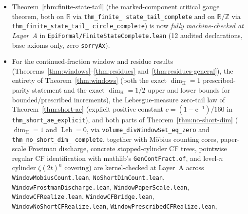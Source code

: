 \documentclass[11pt]{article}
\theoremstyle{definition}
\theoremstyle{remark}
\newcommand{\R}{\mathbb{R}}
\newcommand{\Z}{\mathbb{Z}}
\newcommand{\ee}{\mathrm{e}}
\newcommand{\dimH}{\dim_{\mathrm{H}}}
\begin{document}
\begin{itemize}[leftmargin=1.5em]
(Corollary~\ref{cor:exact-gauge}(i) on $\R$ and \texttt{UnitAddCircle}), and
verifies the binary Cantor-tree positivity, $\mathcal H^{g_2}$-infinitude on
every nonempty open subset of $\R/\Z$, $\sigma$-finiteness,
$\mathcal H^{h_k}$-nullity, and $g_\beta$ threshold dichotomy for
$E_{\mathrm{lim}}(k/4)$ in Theorem~\ref{thm:trichotomy}(ii), while
\texttt{TrichotomyAndPolyExtension.lean} proves the signed-limit coset collapse
$E_{\mathrm{lim}}^\pm(k/4)=x_k^\pm+L$ in Theorem~\ref{thm:trichotomy}(iii).
\item Theorem~\ref{thm:finite-state-tail} (the marked-component critical gauge
theorem, both on $\R$ via \texttt{thm\_\allowbreak finite\_\allowbreak
state\_\allowbreak tail\_\allowbreak complete} and on $\R/\Z$ via
\texttt{thm\_\allowbreak finite\_\allowbreak state\_\allowbreak tail\_\allowbreak
circle\_\allowbreak complete}) is now \emph{fully machine-checked at Layer~A}
in \texttt{EpiFormal/\allowbreak Finite\allowbreak State\allowbreak Complete.lean}
(12 audited declarations, base axioms only, zero \texttt{sorryAx}).
\item For the continued-fraction window and residue results
(Theorems~\ref{thm:windows}--\ref{thm:residues} and~\ref{thm:residues-general}),
the entirety of Theorem~\ref{thm:windows} (both the exact $\dimH=1$
prescribed-parity statement and the exact $\dimH=1/2$ upper and lower bounds
for bounded/prescribed increments), the Lebesgue-measure zero-tail law of
Theorem~\ref{thm:short-ae} (explicit positive constant $c = (1-\ee^{-1})/160$ in
\texttt{thm\_\allowbreak short\_\allowbreak ae\_\allowbreak explicit}), and
both parts of Theorem~\ref{thm:no-short-dim} ($\dimH=1$ and
$\operatorname{Leb}=0$, via
\texttt{volume\_\allowbreak divWindowSet\_\allowbreak eq\_\allowbreak zero}
and \texttt{thm\_\allowbreak no\_\allowbreak short\_\allowbreak dim\_\allowbreak
complete}, together with M\"obius counting cores, paper-scale Frostman
discharge, concrete stopped-cylinder CF trees, pointwise regular CF
identification with mathlib's \texttt{GenContFract.of}, and level-$n$ cylinder
$\zeta(2t)^n$ covering) are kernel-checked at Layer~A across
\texttt{Window\allowbreak Mobius\allowbreak Count.lean},
\texttt{No\allowbreak Short\allowbreak Dim\allowbreak Count.lean},
\texttt{Window\allowbreak Frostman\allowbreak Discharge.lean},
\texttt{Window\allowbreak Paper\allowbreak Scale.lean},
\texttt{Window\allowbreak CF\allowbreak Realize.lean},
\texttt{Window\allowbreak CF\allowbreak Bridge.lean},
\texttt{Window\allowbreak No\allowbreak Short\allowbreak CF\allowbreak Realize.lean},
\texttt{Window\allowbreak Prescribed\allowbreak CF\allowbreak Realize.lean},

\end{itemize}
\end{document}
